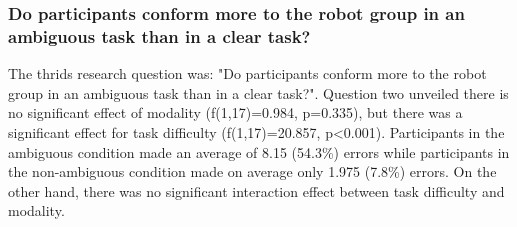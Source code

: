 \documentclass{acm_proc_article-sp}
\begin{document}
\subsubsection{Do participants conform more to the robot group in an ambiguous task than in a clear task?}
The thrids research question was: "Do participants conform more to the robot group in an ambiguous task than in a clear task?". Question two unveiled there is no significant effect of modality (f(1,17)=0.984, p=0.335), but there was a significant effect for task difficulty (f(1,17)=20.857, p<0.001). Participants in the ambiguous condition made an average of 8.15 (54.3\%) errors while participants in the non-ambiguous condition made on average only 1.975 (7.8\%) errors. On the other hand, there was no significant interaction effect between task difficulty and modality.








\end{document}
